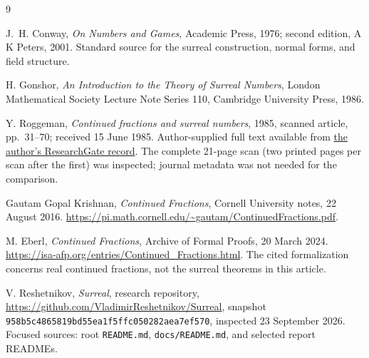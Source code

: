 \documentclass[11pt,a4paper]{article}
\numberwithin{equation}{section}
\theoremstyle{definition}
\theoremstyle{remark}
\begin{document}
\clearpage
{}
{}
\begin{thebibliography}{9}

J.~H. Conway, \emph{On Numbers and Games}, Academic Press, 1976;
second edition, A K Peters, 2001.
Standard source for the surreal construction, normal forms, and field structure.

H. Gonshor, \emph{An Introduction to the Theory of Surreal Numbers},
London Mathematical Society Lecture Note Series 110, Cambridge University
Press, 1986.

Y. Roggeman, \emph{Continued fractions and surreal numbers}, 1985,
scanned article, pp.~31--70; received 15 June 1985.
Author-supplied full text available from
\href{https://www.researchgate.net/publication/268854423_Continued_fractions_and_surreal_numbers}{the author's ResearchGate record}.
The complete 21-page scan (two printed pages per scan after the first)
was inspected; journal metadata was not needed for the comparison.

Gautam Gopal Krishnan, \emph{Continued Fractions}, Cornell University notes,
22 August 2016.
\url{https://pi.math.cornell.edu/~gautam/ContinuedFractions.pdf}.

M. Eberl, \emph{Continued Fractions}, Archive of Formal Proofs,
20 March 2024.
\url{https://isa-afp.org/entries/Continued_Fractions.html}.
The cited formalization concerns real continued fractions, not the
surreal theorems in this article.

V. Reshetnikov, \emph{Surreal}, research repository,
\url{https://github.com/VladimirReshetnikov/Surreal},
snapshot \texttt{958b5c4865819bd55ea1f5ffc050282aea7ef570}, inspected
23 September 2026. Focused sources: root \texttt{README.md},
\texttt{docs/README.md}, and selected report READMEs.

\end{thebibliography}
\end{document}
